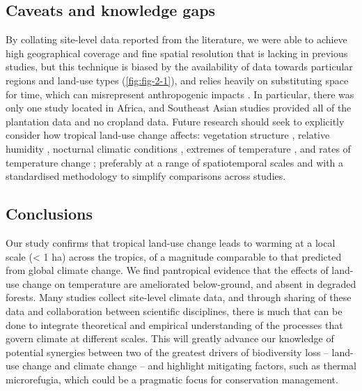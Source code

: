 \documentclass[12pt,a4paper,]{report}
\theoremstyle{definition}
\theoremstyle{definition}
\theoremstyle{definition}
\theoremstyle{remark}
\begin{document}
\subsection{Caveats and knowledge
gaps}\label{caveats-and-knowledge-gaps}

By collating site-level data reported from the literature, we were able
to achieve high geographical coverage and fine spatial resolution that
is lacking in previous studies, but this technique is biased by the
availability of data towards particular regions and land-use types
(\autoref{fig:fig-2-1}), and relies heavily on substituting space for
time, which can misrepresent anthropogenic impacts
\citep{franca_space-for-time2016}. In particular, there was only one
study located in Africa, and Southeast Asian studies provided all of the
plantation data and no cropland data. Future research should seek to
explicitly consider how tropical land-use change affects: vegetation
structure \citep[e.g.~using Leaf Area Index
cf.][]{hardwick_relationship2015}, relative humidity
\citep{luskin_microclimate2011, ewers_fragmentation2013}, nocturnal
climatic conditions
\citep{chen_growing-season1995, dubreuil_impact2011}, extremes of
temperature \citep{christidis_role2013}, and rates of temperature change
\citep{scheffers_microhabitats2014-1}; preferably at a range of
spatiotemporal scales \citep{wiens_matching2010} and with a standardised
methodology to simplify comparisons across studies.

\subsection{Conclusions}\label{conclusions}

Our study confirms that tropical land-use change leads to warming at a
local scale (\textless{} 1 ha) across the tropics, of a magnitude
comparable to that predicted from global climate change. We find
pantropical evidence that the effects of land-use change on temperature
are ameliorated below-ground, and absent in degraded forests. Many
studies collect site-level climate data, and through sharing of these
data and collaboration between scientific disciplines, there is much
that can be done to integrate theoretical and empirical understanding of
the processes that govern climate at different scales. This will greatly
advance our knowledge of potential synergies between two of the greatest
drivers of biodiversity loss -- land-use change and climate change --
and highlight mitigating factors, such as thermal microrefugia, which
could be a pragmatic focus for conservation management.
\end{document}
